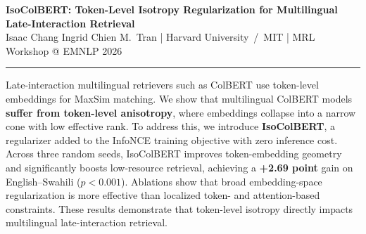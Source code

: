 \documentclass[20pt]{extarticle}
\newcommand{\titlesize}{\fontsize{58}{68}\selectfont}
\newcommand{\authorsize}{\fontsize{28}{32}\selectfont}
\newcommand{\affilsize}{\fontsize{22}{26}\selectfont}
\newcommand{\abstractsize}{\fontsize{21}{26}\selectfont}
\begin{document}
\begin{center}
{\color{primary}\titlesize\bfseries IsoColBERT: Token-Level Isotropy Regularization for Multilingual Late-Interaction Retrieval}\\[12pt]
{\authorsize Isaac Chang \quad Ingrid Chien \quad M.\ Tran} \;\;|\;\;
{\affilsize Harvard University \,/\, MIT \;\;|\;\; MRL Workshop @ EMNLP 2026}
\end{center}

\vspace{4pt}
{\color{accent}\rule{\linewidth}{4pt}}
\vspace{8pt}

\begin{tcolorbox}[
  enhanced, colback=white, colframe=primary,
  boxrule=1.2pt, arc=4pt,
  left=20pt, right=20pt, top=8pt, bottom=8pt,
]
\abstractsize
Late-interaction multilingual retrievers such as ColBERT use token-level embeddings for MaxSim matching. We show that multilingual ColBERT models \textbf{suffer from token-level anisotropy}, where embeddings collapse into a narrow cone with low effective rank. To address this, we introduce \textbf{IsoColBERT}, a regularizer added to the InfoNCE training objective with zero inference cost. Across three random seeds, IsoColBERT improves token-embedding geometry and significantly boosts low-resource retrieval, achieving a \textbf{+2.69 point} gain on English--Swahili ($p < 0.001$). Ablations show that broad embedding-space regularization is more effective than localized token- and attention-based constraints. These results demonstrate that token-level isotropy directly impacts multilingual late-interaction retrieval.
\end{tcolorbox}

\vspace{8pt}
\end{document}

